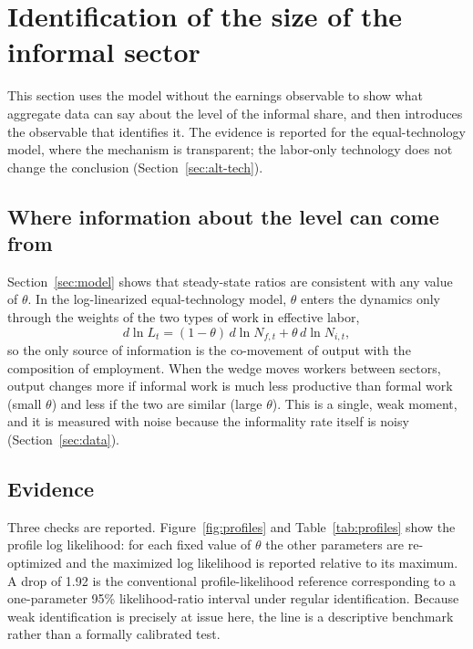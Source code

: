 \section{Identification of the size of the informal sector}

This section uses the model without the earnings observable to show what aggregate data can say about the level of the informal share, and then introduces the observable that identifies it. The evidence is reported for the equal-technology model, where the mechanism is transparent; the labor-only technology does not change the conclusion (Section~\ref{sec:alt-tech}).
\label{sec:identification}

\subsection{Where information about the level can come from}

Section~\ref{sec:model} shows that steady-state ratios are consistent with any value of $\theta$. In the log-linearized equal-technology model, $\theta$ enters the dynamics only through the weights of the two types of work in effective labor,
\begin{equation}
d\ln L_t = (1-\theta)\,d\ln N_{f,t} + \theta\,d\ln N_{i,t},
\label{eq:effective}
\end{equation}
so the only source of information is the co-movement of output with the composition of employment. When the wedge moves workers between sectors, output changes more if informal work is much less productive than formal work (small $\theta$) and less if the two are similar (large $\theta$). This is a single, weak moment, and it is measured with noise because the informality rate itself is noisy (Section~\ref{sec:data}).

\subsection{Evidence}

Three checks are reported. Figure~\ref{fig:profiles} and Table~\ref{tab:profiles} show the profile log likelihood: for each fixed value of $\theta$ the other parameters are re-optimized and the maximized log likelihood is reported relative to its maximum. A drop of 1.92 is the conventional profile-likelihood reference corresponding to a one-parameter 95\% likelihood-ratio interval under regular identification. Because weak identification is precisely at issue here, the line is a descriptive benchmark rather than a formally calibrated test.

